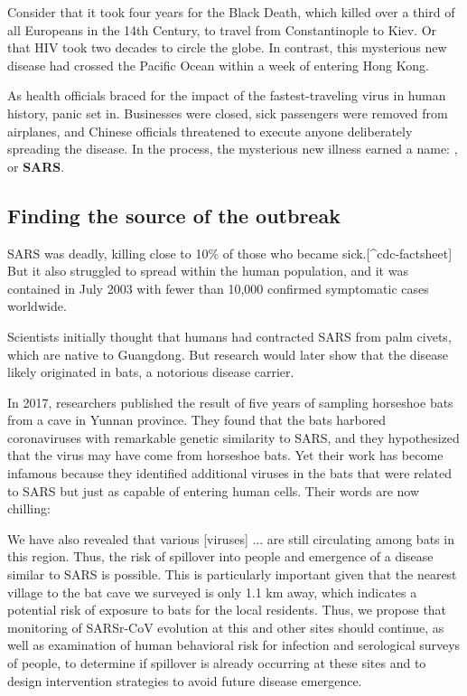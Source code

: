 Consider that it took four years for the Black Death, which killed over a third of all Europeans in the 14th Century, to travel from Constantinople to Kiev. Or that HIV took two decades to circle the globe. In contrast, this mysterious new disease had crossed the Pacific Ocean within a week of entering Hong Kong.

As health officials braced for the impact of the fastest-traveling virus in human history, panic set in. Businesses were closed, sick passengers were removed from airplanes, and Chinese officials threatened to execute anyone deliberately spreading the disease. In the process, the mysterious new illness earned a name: , or \textbf{SARS}.

\FloatBarrier
{}
\subsection{Finding the source of the outbreak}

SARS was deadly, killing close to 10\% of those who became sick.[^cdc-factsheet] But it also struggled to spread within the human population, and it was contained in July 2003 with fewer than 10,000 confirmed symptomatic cases worldwide.

Scientists initially thought that humans had contracted SARS from palm civets, which are native to Guangdong. But research would later show that the disease likely originated in bats, a notorious disease carrier.

In 2017, researchers published the result of five years of sampling horseshoe bats from a cave in Yunnan province. They found that the bats harbored coronaviruses with remarkable genetic similarity to SARS, and they hypothesized that the virus may have come from horseshoe bats. Yet their work has become infamous because they identified additional viruses in the bats that were related to SARS but just as capable of entering human cells. Their words are now chilling:

\begin{displayquote}
	We have also revealed that various [viruses] ... are still circulating among bats in this region. Thus, the risk of spillover into people and emergence of a disease similar to SARS is possible. This is particularly important given that the nearest village to the bat cave we surveyed is only 1.1 km away, which indicates a potential risk of exposure to bats for the local residents. Thus, we propose that monitoring of SARSr-CoV evolution at this and other sites should continue, as well as examination of human behavioral risk for infection and serological surveys of people, to determine if spillover is already occurring at these sites and to design intervention strategies to avoid future disease emergence.
\end{displayquote}

